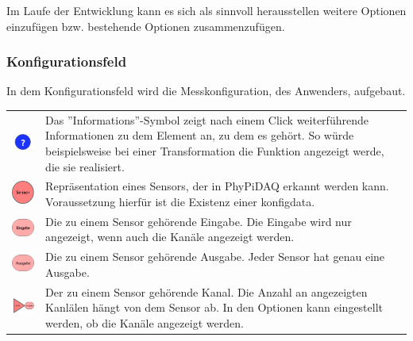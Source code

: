 \documentclass[parskip=full]{scrartcl}
\begin{document}
Im Laufe der Entwicklung kann es sich als sinnvoll herausstellen weitere Optionen einzufügen bzw. bestehende Optionen zusammenzufügen.

\subsubsection{Konfigurationsfeld}

In dem Konfigurationsfeld wird die Messkonfiguration, des Anwenders, aufgebaut.

\begin{tabular}[t]{p{1cm} p{10cm}}
	\vspace{0cm}\includegraphics[width = 1 cm]{Grafik/Information.png} & Das ''Informations''-Symbol zeigt nach einem Click weiterführende Informationen zu dem Element an, zu dem es gehört. So würde beispielsweise bei einer Transformation die Funktion angezeigt werde, die sie realisiert.\newline\\\cline{1-2}
	\vspace{0cm}\includegraphics[width = 1 cm]{Grafik/Sensorelement.png} & Repräsentation eines Sensors, der in PhyPiDAQ erkannt werden kann. Voraussetzung hierfür ist die Existenz einer \gls{konfigdata}.\newline\\
	\vspace{0cm}\includegraphics[width = 1 cm]{Grafik/Eingabe-Sensor.png} & Die zu einem Sensor gehörende Eingabe. Die Eingabe wird nur angezeigt, wenn auch die Kanäle angezeigt werden.\newline\\
	\vspace{0cm}\includegraphics[width = 1 cm]{Grafik/Ausgabe-Sensor.png} & Die zu einem Sensor gehörende Ausgabe. Jeder Sensor hat genau eine Ausgabe.\newline\\
	\vspace{0cm}\includegraphics[width = 1 cm]{Grafik/Kanal.png} & Der zu einem Sensor gehörende Kanal. Die Anzahl an angezeigten Kanlälen hängt von dem Sensor ab. In den Optionen kann eingestellt werden, ob die Kanäle angezeigt werden.\newline\\\cline{1-2}

\end{tabular}
\end{document}

